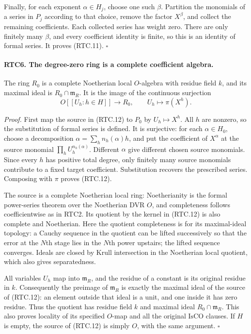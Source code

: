 Finally, for each exponent \(\alpha\in H_j\), choose one such
\(\beta\).  Partition the monomials of a series in \(P_j\)
according to that choice, remove the factor \(X^\beta\), and
collect the remaining coefficients.  Each collected series has
weight zero.  There are only finitely many \(\beta\), and every
coefficient identity is finite, so this is an identity of formal
series.  It proves (RTC.11). \hfill\(\square\)

\paragraph{RTC6. The degree-zero ring is a complete coefficient algebra.}
\label{claim:RTC6}
The ring \(R_0\) is a complete Noetherian local \(O\)-algebra
with residue field \(k\), and its maximal ideal is
\(R_0\cap\mathfrak m_R\).  It is the image of the continuous
surjection
\[
 O[[U_h:h\in H]]\longrightarrow R_0,
       \qquad U_h\longmapsto\pi(X^h).
                                                        \tag{RTC.12}
\]

\emph{Proof.}
First map the source in (RTC.12) to \(P_0\) by
\(U_h\mapsto X^h\).  All \(h\) are nonzero, so the substitution
of formal series is defined.  It is surjective: for each
\(\alpha\in H_0\), choose a decomposition
\(\alpha=\sum_h n_h(\alpha)h\), and put the coefficient of
\(X^\alpha\) at the source monomial
\(\prod_hU_h^{n_h(\alpha)}\).  Different \(\alpha\) give
different chosen source monomials.  Since every \(h\) has positive
total degree, only finitely many source monomials contribute to a
fixed target coefficient.  Substitution recovers the prescribed
series.  Composing with \(\pi\) proves (RTC.12).

The source is a complete Noetherian local ring: Noetherianity is
the formal power-series theorem over the Noetherian DVR \(O\),
and completeness follows coefficientwise as in RTC2.  Its quotient
by the kernel in (RTC.12) is also complete and Noetherian.  Here
the quotient completeness is for its maximal-ideal topology: a
Cauchy sequence in the quotient can be lifted successively so that
the error at the \(N\)th stage lies in the \(N\)th power upstairs;
the lifted sequence converges.  Ideals are closed by Krull
intersection in the Noetherian local quotient, which also gives
separatedness.

All variables \(U_h\) map into \(\mathfrak m_R\), and the
residue of a constant is its original residue in \(k\).
Consequently the preimage of \(\mathfrak m_R\) is exactly the
maximal ideal of the source of (RTC.12): an element outside that
ideal is a unit, and one inside it has zero residue.  Thus the
quotient has residue field \(k\) and maximal ideal
\(R_0\cap\mathfrak m_R\).  This also proves locality of its
specified \(O\)-map and all the original \(\mathrm{IsCO}\)
clauses.  If \(H\) is empty, the source of (RTC.12) is simply
\(O\), with the same argument. \hfill\(\square\)

